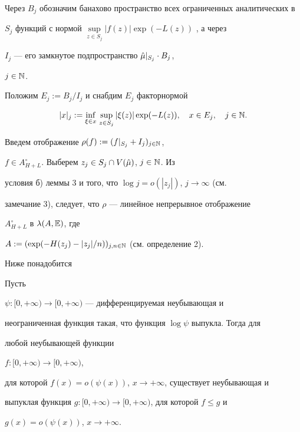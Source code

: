  


Через $B_j$ обозначим банахово пространство всех ограниченных аналитических в 


$S_j$ функций с нормой $\sup\limits_{z\in S_j}|f(z)|\exp(-L(z))$ , а через 


$I_j$ --- его замкнутое подпространство $\Hat\mu\vert_{S_j}\cdot B_j$, 


$j\in\Bbb N$. 


Положим $E_j:=B_j/I_j$ и снабдим $E_j$ факторнормой 


$$ 


|x|_j:=\inf_{\xi\in x}\,\sup_{z\in S_j}|\xi(z)|\exp(-L(z)), 


\quad x\in E_j,\quad j\in\Bbb N. 


$$ 


Введем отображение $\rho(f):=(f\vert_{S_j}+I_j)_{j\in\Bbb N}$, 


$f\in A^\circ_{H+L}$. Выберем $z_j\in S_j\cap V(\Hat\mu)$, $j\in\Bbb N$. Из 


условия б) леммы 3 и того, что $\log j=o(|z_j|)$, $j\to\infty$ (см. 


замечание 3), следует, что $\rho$ --- линейное непрерывное отображение 


$A^\circ_{H+L}$ в $\lambda(A,\Bbb E)$, где 


$A:=(\exp(-H(z_j)-|z_j|/n))_{j,n\in\Bbb N}$ (см. определение 2). 





Ниже понадобится 





\begin{lem}


Пусть 


$\psi :[0,+\infty)\to[0,+\infty)$ --- дифференцируемая неубывающая и 


неограниченная функция такая, что функция $\log \psi$ выпукла. Тогда для 


любой неубывающей функции 


$f:[0,+\infty)\to[0,+\infty)$,


для которой $f(x)=o(\psi(x))$, $x\to +\infty$, существует неубывающая и 


выпуклая функция $g:[0,+\infty)\to[0,+\infty)$, для которой $f\le g$ и 


$g(x)=o(\psi(x))$, $x\to +\infty$. 


\end{lem} 


